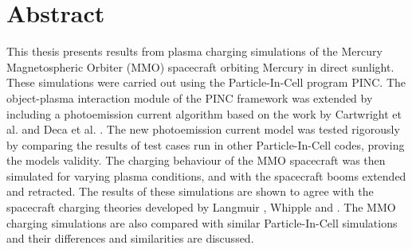 \chapter{Abstract}
\label{sec:abstract}
This thesis presents results from plasma charging simulations of the Mercury Magnetospheric Orbiter (MMO) spacecraft orbiting Mercury in direct sunlight. These simulations were carried out using the Particle-In-Cell program PINC. The object-plasma interaction module of the PINC framework was extended by including a photoemission current algorithm based on the work by Cartwright et al. \parencite{Cartwright2000} and Deca et al. \parencite{Deca2013}. The new photoemission current model was tested rigorously by comparing the results of test cases run in other Particle-In-Cell codes, proving the models validity. The charging behaviour of the MMO spacecraft was then simulated for varying plasma conditions, and with the spacecraft booms extended and retracted. The results of these simulations are shown to agree with the spacecraft charging theories developed by Langmuir \parencite{Mott-Smith1926}, Whipple \parencite{Shipple1981} and \parencite{Garrett1981}. The MMO charging simulations are also compared with similar Particle-In-Cell simulations and their differences and similarities are discussed.